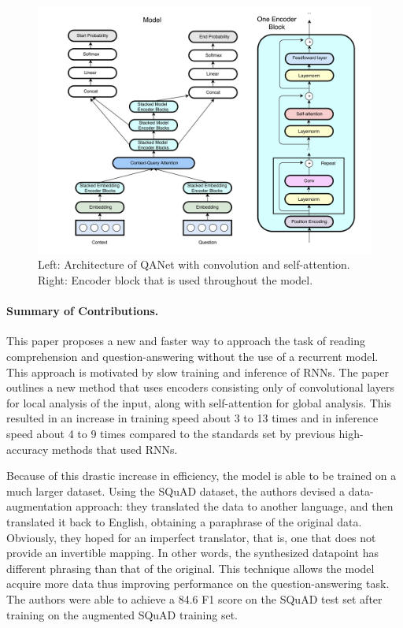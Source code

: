 \documentclass{article}
\begin{document}
\begin{figure}[h]
\centering
\includegraphics[scale=0.23]{model_diagram}
\caption{Left: Architecture of QANet with convolution and self-attention. Right: Encoder block that is used throughout the model.}
\end{figure}

\paragraph{Summary of Contributions.}
This paper proposes a new and faster way to approach the task of reading comprehension and question-answering without the use of a recurrent model. This approach is motivated by slow training and inference of RNNs. The paper outlines a new method that uses encoders consisting only of convolutional layers for local analysis of the input, along with self-attention for global analysis. This resulted in an increase in training speed about 3 to 13 times and in inference speed about 4 to 9 times compared to the standards set by previous high-accuracy methods that used RNNs.

Because of this drastic increase in efficiency, the model is able to be trained on a much larger dataset. Using the SQuAD dataset, the authors devised a data-augmentation approach: they translated the data to another language, and then translated it back to English, obtaining a paraphrase of the original data. Obviously, they hoped for an imperfect translator, that is, one that does not provide an invertible mapping. In other words, the synthesized datapoint has different phrasing than that of the original. This technique allows the model acquire more data thus improving performance on the question-answering task. The authors were able to achieve a 84.6 F1 score on the SQuAD test set after training on the augmented SQuAD training set.
\end{document}
